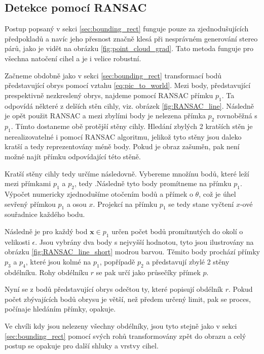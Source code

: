 \documentclass[twoside]{ctuthesis}
\begin{document}
\subsection{Detekce pomocí RANSAC}
Postup popsaný v sekci \ref{sec:bounding_rect} funguje pouze za zjednodušujících předpokladů a navíc jeho přesnost značně klesá při nesprávném generování stereo párů, jako je vidět na obrázku \ref{fig:point_cloud_grad}. Tato metoda funguje pro všechna natočení cihel a je i velice robustní.

Začneme obdobně jako v sekci \ref{sec:bounding_rect} transformací bodů představující obrys pomocí vztahu \ref{eq:pic_to_world}. Mezi body, představující prespektivně nezkreslený obrys, najdeme pomocí RANSAC přímku $p_1$. Ta odpovídá některé z delších stěn cihly, viz. obrázek \ref{fig:RANSAC_line}. Následně je opět použit RANSAC a mezi zbylími body je nelezena přímka $p_2$ rovnoběžná s $p_1$. Tímto dostaneme obě protější stěny cihly. Hledání zbylých 2 kratších stěn je nerealizovatelné i pomocí RANSAC algoritmu, jelikož tyto stěny jsou daleko kratší a tedy reprezentovány méně body. Pokud je obraz zašuměn, pak není možné najít přímku odpovídající této stěně.

Kratší stěny cihly tedy určíme následovně. Vybereme množínu bodů, které leží mezi přímkami $p_1$ a $p_2$, tedy .Následně tyto body promítneme na přímku $p_1$. Výpočet numericky zjednodušíme otočením bodů a přímek o $\theta$, což je úhel sevřený přímkou $p_1$ a osou $x$. Projekcí na přímku $p_1$ se tedy stane vyčtení $x$-ové souřadnice každého bodu.

Následně je pro každý bod $\mathbf{x} \in p_1$ určen počet bodů promítnutých do okolí o velikosti $\epsilon$. Jsou vybrány dva body s nejvyšší hodnotou, tyto jsou ilustrovány na obrázku \ref{fig:RANSAC_line_short} modrou barvou. Těmito body prochází přímky $p_3$ a $p_4$, které jsou kolmé na $p_1$, popřípadě $p_2$ a představují zbylé 2 stěny obdélníku. Rohy obdélníku $r$ se pak určí jako průsečíky přímek $p$.

Nyní se z bodů představující obrys odečtou ty, které popisují obdélník $r$. Pokud počet zbývajících bodů obrysu je větší, než předem určený limit, pak se proces, počínaje hledáním přímky, opakuje.

Ve chvíli kdy jsou nelezeny všechny obdélníky, jsou tyto stejně jako v sekci \ref{sec:bounding_rect} pomocí svých rohů transformovány zpět do obrazu a celý postup se opakuje pro další shluky a vrstvy cihel.
\end{document}
